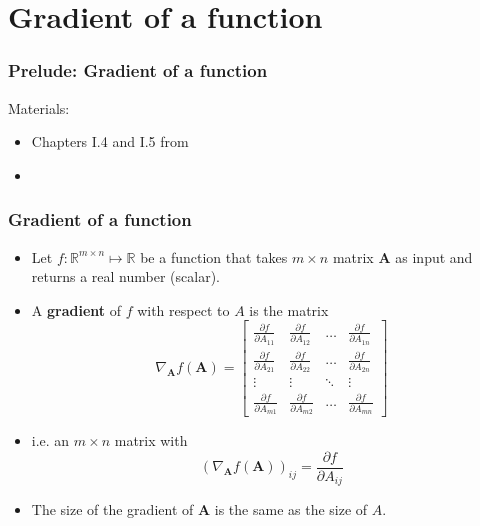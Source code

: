 \documentclass[notes]{beamer}          %
\newcommand{\vect}[1]{\bm{#1}}
\newcommand{\field}[1]{\mathbb{#1}}
\newcommand{\R}{\field{R}}
\newif\iffull
\begin{document}
\iffull
\begin{frame}
\frametitle{Trace}
    \begin{itemize}
        \item A {\bf trace} of a matrix is defined as
        $$Tr(\vect{A}) = \sum_{i} \vect{A}_{i,i} $$
        \item Expressions in terms of the trace operators allow to exploit many useful identities, e.g.
        $$Tr(\vect{A}\vect{B}\vect{C}) = Tr(\vect{B}\vect{C}\vect{A}) = Tr(\vect{C}\vect{A}\vect{B})$$
    \end{itemize}

\end{frame}
\fi

\fi %

\section{Gradient of a function}


\begin{frame}
\frametitle{Prelude: Gradient of a function}
Materials:
\begin{itemize}
    \item Chapters I.4 and I.5 from \cite{deeplearning}
    \item \cite{linearalgebra}
\end{itemize}
\end{frame}

\begin{frame}
\frametitle{Gradient of a function}
    \begin{itemize}
        \item Let $f: \R^{m \times n} \mapsto \R$ be a function that takes $m \times n$ matrix $\vect{A}$ as input and returns a real number (scalar).
        \item A {\bf gradient} of $f$ with respect to $A$ is the matrix
        $$
        \nabla_{\vect{A}} f(\vect{A}) =
        \begin{bmatrix}
         \frac{\partial f}{\partial A_{11}} & \frac{\partial f}{\partial A_{12}} & \ldots & \frac{\partial f}{\partial A_{1n}} \\
          \frac{\partial f}{\partial A_{21}} & \frac{\partial f}{\partial A_{22}} & \ldots & \frac{\partial f}{\partial A_{2n}} \\
          \vdots & \vdots & \ddots & \vdots \\
           \frac{\partial f}{\partial A_{m1}} & \frac{\partial f}{\partial A_{m2}} & \ldots & \frac{\partial f}{\partial A_{mn}}
        \end{bmatrix}
        $$
        \item i.e. an $m \times n$ matrix with  $$(\nabla_{\vect{A}} f(\vect{A}))_{ij} = \frac{\partial f}{\partial A_{ij}}  $$
        \item The size of the gradient of $\vect{A}$ is the same as the size of $A$.

    \end{itemize}
\end{frame}
\end{document}
